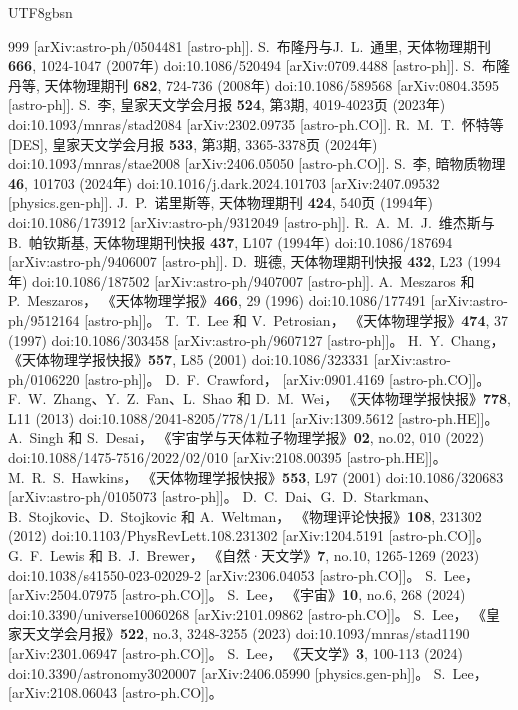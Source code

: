 \documentclass[jkps,preprint,fleqn]{revtex4}
\begin{document}
\begin{CJK*}{UTF8}{gbsn}
\begin{thebibliography}{999}
[arXiv:astro-ph/0504481 [astro-ph]].
S.~布隆丹与J.~L.~通里,
天体物理期刊 \textbf{666}, 1024-1047 (2007年)
doi:10.1086/520494
[arXiv:0709.4488 [astro-ph]].
S.~布隆丹等,
天体物理期刊 \textbf{682}, 724-736 (2008年)
doi:10.1086/589568
[arXiv:0804.3595 [astro-ph]].
S.~李,
皇家天文学会月报 \textbf{524}, 第3期, 4019-4023页 (2023年)
doi:10.1093/mnras/stad2084
[arXiv:2302.09735 [astro-ph.CO]].
R.~M.~T.~怀特等[DES],
皇家天文学会月报 \textbf{533}, 第3期, 3365-3378页 (2024年)
doi:10.1093/mnras/stae2008
[arXiv:2406.05050 [astro-ph.CO]].
S.~李,
暗物质物理 \textbf{46}, 101703 (2024年)
doi:10.1016/j.dark.2024.101703
[arXiv:2407.09532 [physics.gen-ph]].
J.~P.~诺里斯等,
天体物理期刊 \textbf{424}, 540页 (1994年)
doi:10.1086/173912
[arXiv:astro-ph/9312049 [astro-ph]].
R.~A.~M.~J.~维杰斯与B.~帕钦斯基,
天体物理期刊快报 \textbf{437}, L107 (1994年)
doi:10.1086/187694
[arXiv:astro-ph/9406007 [astro-ph]].
D.~班德,
天体物理期刊快报 \textbf{432}, L23 (1994年)
doi:10.1086/187502
[arXiv:astro-ph/9407007 [astro-ph]].
A.~Meszaros 和 P.~Meszaros，
《天体物理学报》\textbf{466}, 29 (1996)
doi:10.1086/177491
[arXiv:astro-ph/9512164 [astro-ph]]。
T.~T.~Lee 和 V.~Petrosian，
《天体物理学报》\textbf{474}, 37 (1997)
doi:10.1086/303458
[arXiv:astro-ph/9607127 [astro-ph]]。
H.~Y.~Chang，
《天体物理学报快报》\textbf{557}, L85 (2001)
doi:10.1086/323331
[arXiv:astro-ph/0106220 [astro-ph]]。
D.~F.~Crawford，
[arXiv:0901.4169 [astro-ph.CO]]。
F.~W.~Zhang、Y.~Z.~Fan、L.~Shao 和 D.~M.~Wei，
《天体物理学报快报》\textbf{778}, L11 (2013)
doi:10.1088/2041-8205/778/1/L11
[arXiv:1309.5612 [astro-ph.HE]]。
A.~Singh 和 S.~Desai，
《宇宙学与天体粒子物理学报》\textbf{02}, no.02, 010 (2022)
doi:10.1088/1475-7516/2022/02/010
[arXiv:2108.00395 [astro-ph.HE]]。
M.~R.~S.~Hawkins，
《天体物理学报快报》\textbf{553}, L97 (2001)
doi:10.1086/320683
[arXiv:astro-ph/0105073 [astro-ph]]。
D.~C.~Dai、G.~D.~Starkman、B.~Stojkovic、D.~Stojkovic 和 A.~Weltman，
《物理评论快报》\textbf{108}, 231302 (2012)
doi:10.1103/PhysRevLett.108.231302
[arXiv:1204.5191 [astro-ph.CO]]。
G.~F.~Lewis 和 B.~J.~Brewer，
《自然·天文学》\textbf{7}, no.10, 1265-1269 (2023)
doi:10.1038/s41550-023-02029-2
[arXiv:2306.04053 [astro-ph.CO]]。
S.~Lee，
[arXiv:2504.07975 [astro-ph.CO]]。
S.~Lee，
《宇宙》\textbf{10}, no.6, 268 (2024)
doi:10.3390/universe10060268
[arXiv:2101.09862 [astro-ph.CO]]。
S.~Lee，
《皇家天文学会月报》\textbf{522}, no.3, 3248-3255 (2023)
doi:10.1093/mnras/stad1190
[arXiv:2301.06947 [astro-ph.CO]]。
S.~Lee，
《天文学》\textbf{3}, 100-113 (2024)
doi:10.3390/astronomy3020007
[arXiv:2406.05990 [physics.gen-ph]]。
S.~Lee，
[arXiv:2108.06043 [astro-ph.CO]]。
\end{thebibliography}
\end{CJK*}
\end{document}
